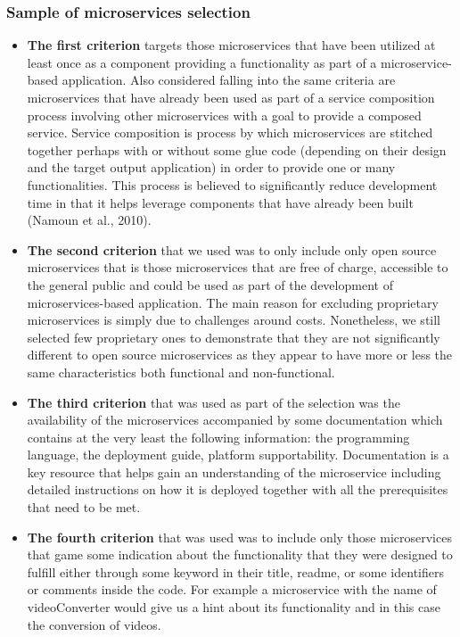 \documentclass{article}
\begin{document}
\subsubsection{Sample of microservices selection}


\begin{itemize} 

\item \textbf{The first criterion} targets those microservices that have been utilized at least once as a component providing a functionality as part of a microservice-based application. Also considered falling into the same criteria are microservices that have already been used as part of a service composition process involving other microservices with a goal to provide a composed service. Service composition is process by which microservices are stitched together perhaps with or without some glue code (depending on their design and the target output application) in order to provide one or many functionalities. This process is believed to significantly reduce development time in that it helps leverage components that have already been built (Namoun et al., 2010).

\item \textbf{The second criterion} that we used was to only include only open source microservices that is those microservices that are free of charge, accessible to the general public and could be used as part of the development of microservices-based application. The main reason for excluding proprietary microservices is simply due to challenges around costs. Nonetheless, we still selected few proprietary ones to demonstrate that they are not significantly different to open source microservices as they appear to have more or less the same characteristics both functional and non-functional.

\item \textbf{The third criterion} that was used as part of the selection was the availability of the microservices accompanied by some documentation which contains at the very least the following information: the programming language, the deployment guide, platform supportability. Documentation is a key resource that helps gain an understanding of the microservice including detailed instructions on how it is deployed together with all the prerequisites that need to be met.

\item \textbf{The fourth criterion} that was used was to include only those microservices that game some indication about the functionality that they were designed to fulfill either through some keyword in their title, readme, or some identifiers or comments inside the code. For example a microservice with the name of videoConverter would give us a hint about its functionality and in this case the conversion of videos. 


\end{itemize}
\end{document}
